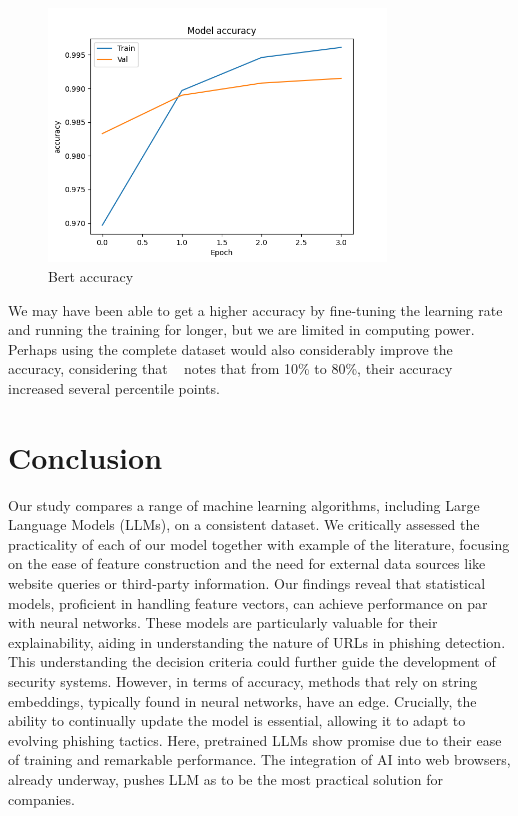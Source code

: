 \documentclass{article}
\begin{document}
    \begin{figure}[H]
        \centering
        \includegraphics[width=0.8\textwidth]{report_img/bert_results/metric_accuracy}
        \caption{Bert accuracy}
        \label{fig:}
    \end{figure}

    We may have been able to get a higher accuracy by fine-tuning the learning rate and running the training for longer, but we are limited in computing power.
    Perhaps using the complete dataset would also considerably improve the accuracy, considering that ~\cite{PhishBert} notes that from 10\% to 80\%, their accuracy increased several percentile points.

    \section{Conclusion}\label{sec:conclusion}

    Our study compares a range of machine learning algorithms, including Large Language Models (LLMs), on a consistent dataset.
    We critically assessed the practicality of each of our model together with example of the literature, focusing on the ease of feature construction and the need for external data sources like website queries or third-party information.
    Our findings reveal that statistical models, proficient in handling feature vectors, can achieve performance on par with neural networks.
    These models are particularly valuable for their explainability, aiding in understanding the nature of URLs in phishing detection.
    This understanding the decision criteria could further guide the development of security systems.
    However, in terms of accuracy, methods that rely on string embeddings, typically found in neural networks, have an edge.
    Crucially, the ability to continually update the model is essential, allowing it to adapt to evolving phishing tactics.
    Here, pretrained LLMs show promise due to their ease of training and remarkable performance.
    The integration of AI into web browsers, already underway, pushes LLM as to be the most practical solution for companies.
\end{document}
